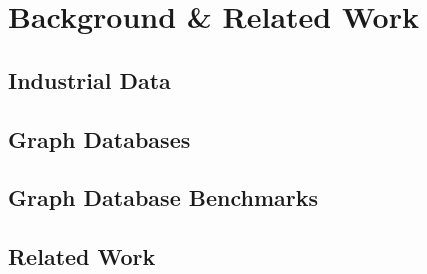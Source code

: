 
\chapter{Background \& Related Work}
\label{ch:Background}

\section{Industrial Data}

\section{Graph Databases}

\section{Graph Database Benchmarks}

\section{Related Work}
